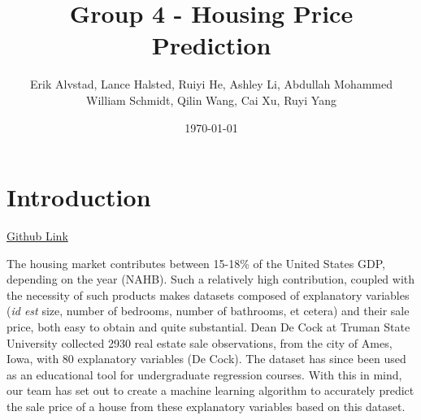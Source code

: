 \documentclass[12pt]{article}
\title{Group 4 - Housing Price Prediction}
\date{\today}
\author{
Erik Alvstad, Lance Halsted, Ruiyi He, Ashley Li, Abdullah Mohammed\\William Schmidt, Qilin Wang, Cai Xu, Ruyi Yang
}
\begin{document}
\maketitle

\section*{Introduction}
\href{https://github.com/wilschmidtt/Group-4-Housing-Prices}{Github Link}
\\
\par \qquad The housing market contributes between 15-18\% of the United States GDP, depending on the year (NAHB). Such a relatively high contribution, coupled with the necessity of such products makes datasets composed of explanatory variables (\emph{id est} size, number of bedrooms, number of bathrooms, et cetera) and their sale price, both easy to obtain and quite substantial. Dean De Cock at Truman State University collected 2930 real estate sale observations, from the city of Ames, Iowa, with 80 explanatory variables (De Cock). The dataset has since been used as an educational tool for undergraduate regression courses. With this in mind, our team has set out to create a machine learning algorithm to accurately predict the sale price of a house from these explanatory variables based on this dataset.
\end{document}
